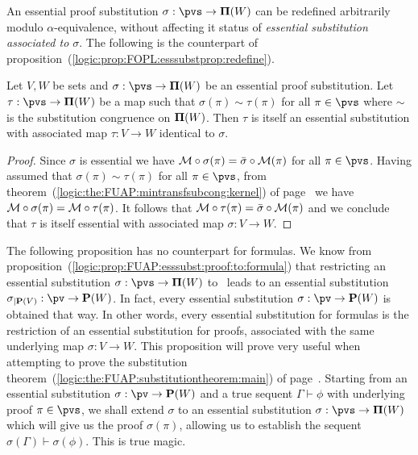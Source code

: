 An essential proof substitution $\sigma:\pvs\to{\bf\Pi}(W)$ can be
redefined arbitrarily modulo $\alpha$-equivalence, without affecting
it status of {\em essential substitution associated to $\sigma$}.
The following is the counterpart of
proposition~(\ref{logic:prop:FOPL:esssubstprop:redefine}).

\begin{prop}\label{logic:prop:FUAP:esssubstprop:redefine}
Let $V,W$ be sets and $\sigma:\pvs\to{\bf\Pi}(W)$ be an essential
proof substitution. Let $\tau:\pvs\to{\bf\Pi}(W)$ be a map such that
$\sigma(\pi)\sim\tau(\pi)$ for all $\pi\in\pvs$ where $\sim$ is the
substitution congruence on ${\bf\Pi}(W)$. Then $\tau$ is itself an
essential substitution with associated map $\tau:V\to W$ identical
to $\sigma$.
\end{prop}
\begin{proof}
Since $\sigma$ is essential we have ${\cal
M}\circ\sigma(\pi)=\bar{\sigma}\circ{\cal M}(\pi)$ for all
$\pi\in\pvs$. Having assumed that $\sigma(\pi)\sim\tau(\pi)$ for all
$\pi\in\pvs$, from
theorem~(\ref{logic:the:FUAP:mintransfsubcong:kernel}) of
page~\pageref{logic:the:FUAP:mintransfsubcong:kernel} we have ${\cal
M}\circ\sigma(\pi)={\cal M}\circ\tau(\pi)$. It follows that ${\cal
M}\circ\tau(\pi)=\bar{\sigma}\circ{\cal M}(\pi)$ and we conclude
that $\tau$ is itself essential with associated map $\sigma:V\to W$.
\end{proof}

The following proposition has no counterpart for formulas. We know
from proposition~(\ref{logic:prop:FUAP:esssubst:proof:to:formula})
that restricting an essential substitution
$\sigma:\pvs\to{\bf\Pi}(W)$ to \pv\ leads to an essential
substitution $\sigma_{|{\bf P}(V)}:\pv\to{\bf P}(W)$. In fact, every
essential substitution $\sigma:\pv\to{\bf P}(W)$ is obtained that
way. In other words, every essential substitution for formulas is
the restriction of an essential substitution for proofs, associated
with the same underlying map $\sigma:V\to W$. This proposition will
prove very useful when attempting to prove the substitution
theorem~(\ref{logic:the:FUAP:substitutiontheorem:main}) of
page~\pageref{logic:the:FUAP:substitutiontheorem:main}. Starting
from an essential substitution $\sigma:\pv\to{\bf P}(W)$ and a true
sequent $\Gamma\vdash\phi$ with underlying proof $\pi\in\pvs$, we
shall extend $\sigma$ to an essential substitution
$\sigma:\pvs\to{\bf\Pi}(W)$ which will give us the proof
$\sigma(\pi)$, allowing us to establish the sequent
$\sigma(\Gamma)\vdash\sigma(\phi)$. This is true magic.

